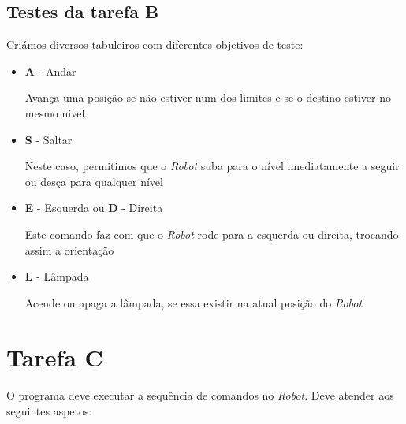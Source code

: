 \documentclass[a4paper,12pt]{article}
\begin{document}
\subsection{Testes da tarefa B}
Criámos diversos tabuleiros com diferentes objetivos de teste:

\begin{itemize}

\item {\textbf{A}} - Andar

Avança uma posição se não estiver num dos limites e se o destino estiver no mesmo nível.

\item {\textbf{S}} - Saltar

Neste caso, permitimos que o \emph{Robot} suba para o nível imediatamente a seguir ou desça para qualquer nível

\item {\textbf{E}} - Esquerda ou {\textbf{D}} - Direita

Este comando faz com que o \emph{Robot} rode para a esquerda ou direita, trocando assim a orientação

\item {\textbf{L}} - Lâmpada

Acende ou apaga a lâmpada, se essa existir na atual posição do \emph{Robot}

\end{itemize}

\section{Tarefa C}

\paragraph{}
O programa deve executar a sequência de comandos no \emph{Robot}. Deve atender aos seguintes aspetos:
\end{document}
